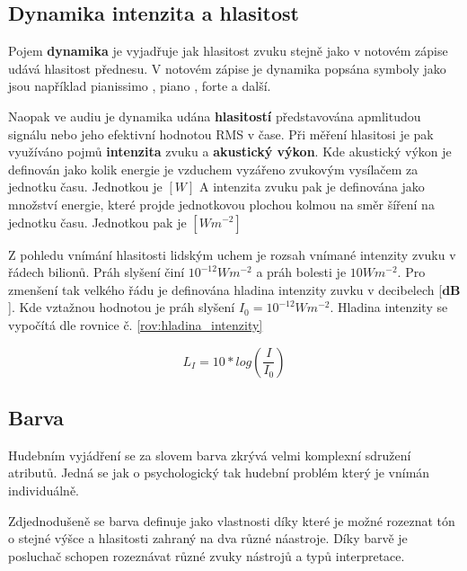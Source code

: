 
  \subsection{Dynamika intenzita a hlasitost} \label{sec:Frekvence}

  Pojem \textbf{dynamika} je vyjadřuje jak hlasitost  zvuku stejně jako v notovém zápise udává hlasitost  přednesu.
  V notovém zápise je dynamika popsána symboly jako jsou například pianissimo , piano , forte  a další.

  Naopak ve audiu je dynamika udána \textbf{hlasitostí } představována apmlitudou signálu nebo jeho efektivní hodnotou \acs{RMS} v čase.
  Při měření hlasitosi je pak využíváno pojmů \textbf{intenzita} zvuku a \textbf{akustický výkon}.
  Kde akustický výkon je definován jako kolik energie je vzduchem vyzářeno zvukovým vysílačem za jednotku času. Jednotkou je $[W]$
  A intenzita zvuku pak je definována jako množství energie, které projde jednotkovou plochou kolmou na směr šíření na jednotku času. Jednotkou pak je $[Wm^{-2}]$ \cite{intenzita_zvuku_definice}
  
  Z pohledu vnímání hlasitosti lidským uchem je rozsah vnímané intenzity zvuku v řádech bilionů. Práh slyšení činí $10^{-12} Wm^{-2}$ a práh bolesti je $10 Wm^{-2}$.
  Pro zmenšení tak velkého řádu je definována hladina intenzity zuvku v decibelech [$\textbf{dB}$]. Kde vztažnou hodnotou je práh slyšení $I_0 = 10^{-12} Wm^{-2}$.
  Hladina intenzity se vypočítá dle rovnice č. \ref*{rov:hladina_intenzity}

  \begin{equation}
    L_I = 10*log(\frac{I}{I_0})
    \label{rov:hladina_intenzity}
  \end{equation}

  \subsection{Barva} \label{sec:Barva}

  Hudebním vyjádření se za slovem barva zkrývá velmi komplexní sdružení atributů.
  Jedná se jak o psychologický tak hudební problém který je vnímán individuálně.
  \cite{The_perception_of_musical_timbre}

  Zdjednodušeně se barva definuje jako vlastnosti díky které je možné rozeznat tón o stejné výšce a hlasitosti zahraný na dva různé náastroje.
  Díky barvě je posluchač schopen rozeznávat různé zvuky nástrojů a typů interpretace.

